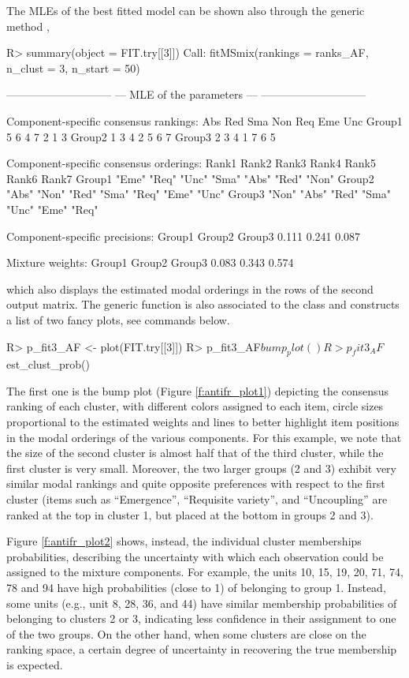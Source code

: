 The MLEs of the best fitted model can be shown also through the generic method ,
\begin{example}
R> summary(object = FIT.try[[3]])
Call:
fitMSmix(rankings = ranks_AF, n_clust = 3, n_start = 50)

-----------------------------
--- MLE of the parameters ---
-----------------------------

Component-specific consensus rankings:
       Abs Red Sma Non Req Eme Unc
Group1   5   6   4   7   2   1   3
Group2   1   3   4   2   5   6   7
Group3   2   3   4   1   7   6   5

Component-specific consensus orderings:
       Rank1 Rank2 Rank3 Rank4 Rank5 Rank6 Rank7
Group1 "Eme" "Req" "Unc" "Sma" "Abs" "Red" "Non"
Group2 "Abs" "Non" "Red" "Sma" "Req" "Eme" "Unc"
Group3 "Non" "Abs" "Red" "Sma" "Unc" "Eme" "Req"

Component-specific precisions:
Group1 Group2 Group3 
 0.111  0.241  0.087 

Mixture weights:
Group1 Group2 Group3 
 0.083  0.343  0.574 
\end{example}
which also displays the estimated modal orderings in the rows of the second output matrix. The generic function  is also associated to the class  and constructs a list of two fancy plots, see commands below. 
\begin{example}
R> p_fit3_AF <- plot(FIT.try[[3]])
R> p_fit3_AF$bump_plot()
R> p_fit3_AF$est_clust_prob()
\end{example}
The first one is the bump plot (Figure \ref{f:antifr_plot1}) depicting the consensus ranking of each cluster, with different colors assigned to each item, circle sizes proportional to the estimated weights and lines to better highlight item positions in the modal orderings of the various components. For this example, we note that the size of the second cluster is almost half that of the third cluster, while the first cluster is very small. Moreover, the two larger groups (2 and 3) exhibit very similar modal rankings and quite opposite preferences with respect to the first cluster (items such as ``Emergence'', ``Requisite variety'', and ``Uncoupling'' are ranked at the top in cluster 1, but placed at the bottom in groups 2 and 3). 

Figure \ref{f:antifr_plot2} shows, instead, the individual cluster memberships probabilities, describing the uncertainty with which each observation could be assigned to the mixture components. For example, the units 10, 15, 19, 20, 71, 74, 78 and 94 have high probabilities (close to 1) of belonging to group 1. Instead, some units (e.g., unit 8, 28, 36, and 44) have similar membership probabilities of belonging to clusters 2 or 3, indicating less confidence in their assignment to one of the two groups. On the other hand, when some clusters are close on the ranking space, a certain degree of uncertainty in recovering the true membership is expected.

